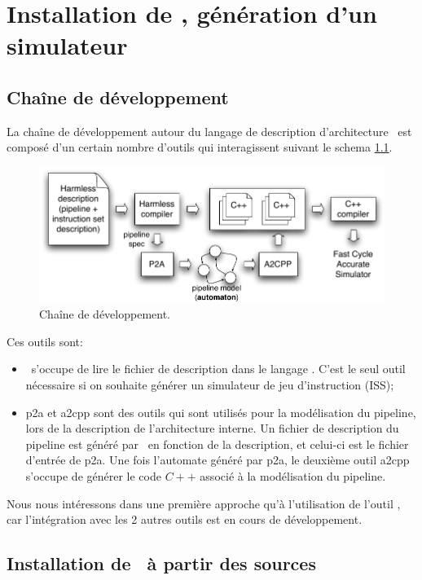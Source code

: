 \chapter{Installation de \harmless, génération d'un simulateur}
\section{Chaîne de développement}
La chaîne de développement autour du langage de description d'architecture \harmless\ est composé d'un certain nombre d'outils qui interagissent suivant le schema \ref{fig:devTool}.
\begin{figure}		%
  \begin{center}
    \includegraphics[width=0.8 \linewidth]{../common/images/devTools.pdf}
    \caption{Chaîne de développement.}
    \label{fig:devTool}
  \end{center}
\end{figure}

Ces outils sont:
\begin{itemize}
\item \gadl\ s'occupe de lire le fichier de description dans le langage \harmless. C'est le seul outil nécessaire si on souhaite générer un simulateur de jeu d'instruction (ISS);
\item p2a et a2cpp sont des outils qui sont utilisés pour la modélisation du pipeline, lors de la description de l'architecture interne. Un fichier de description du pipeline est généré par \gadl\ en fonction de la description, et celui-ci est le fichier d'entrée de p2a. Une fois l'automate généré par p2a, le deuxième outil a2cpp s'occupe de générer le code $C++$ associé à la modélisation du pipeline.
\end{itemize}

Nous nous intéressons dans une première approche qu'à l'utilisation de l'outil \gadl, car l'intégration avec les 2 autres outils est en cours de développement.

\section{Installation de \gadl\ à partir des sources}
